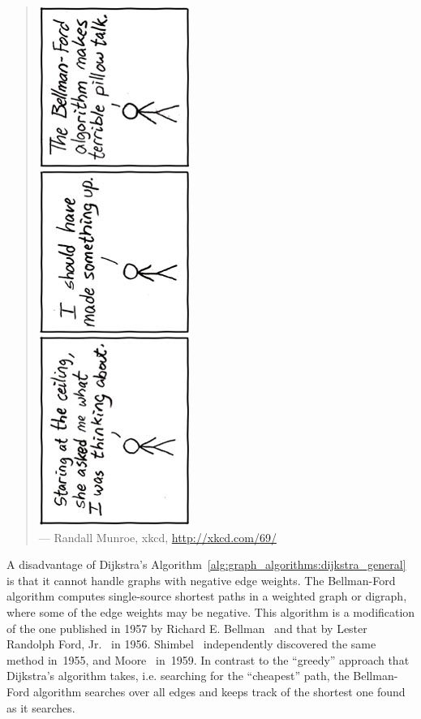 \begin{quote}
\includegraphics[scale=2.5]{image/graph-algorithms/pillow-talk-bellman-ford} \\
\noindent
--- Randall Munroe, xkcd,
\url{http://xkcd.com/69/}
\end{quote}

\noindent
A disadvantage of Dijkstra's
Algorithm~\ref{alg:graph_algorithms:dijkstra_general} is that it
cannot handle graphs with negative edge
weights. The
Bellman-Ford algorithm computes
single-source shortest paths in a
weighted graph or digraph, where some of the edge weights may be
negative. This algorithm is a modification of
the one published in 1957 by Richard E.
Bellman~\cite{Bellman1957} and that by
Lester Randolph Ford,
Jr.~\cite{Ford1956} in
1956. Shimbel~\cite{Shimbel1955} independently
discovered the same method in~1955, and
Moore~\cite{Moore1959} in~1959. In contrast to
the ``greedy'' approach that Dijkstra's
algorithm takes, i.e. searching for the
``cheapest'' path, the Bellman-Ford
algorithm searches over all edges and
keeps track of the shortest one found as it searches.

